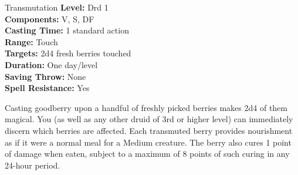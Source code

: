 {Transmutation}
{
	\textbf{Level:}
	Drd 1\\
	\textbf{Components:}
	V, S, DF\\
	\textbf{Casting Time:}
	1 standard action\\
	\textbf{Range:}
	Touch\\
	\textbf{Targets:}
	2d4 fresh berries touched\\
	\textbf{Duration:}
	One day/level\\
	\textbf{Saving Throw:}
	None\\
	\textbf{Spell Resistance:}
	Yes\\
}
{
	Casting goodberry upon a handful of freshly picked berries makes 2d4 of them magical. You (as well as any other druid of 3rd or higher level) can immediately discern which berries are affected. Each transmuted berry provides nourishment as if it were a normal meal for a Medium creature. The berry also cures 1 point of damage when eaten, subject to a maximum of 8 points of such curing in any 24-hour period.

}
